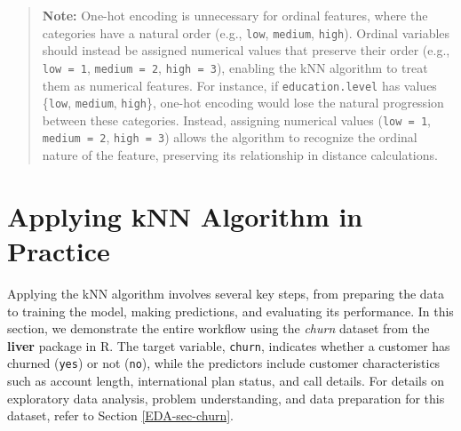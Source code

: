 \documentclass[
  11pt,
]{book}
\newcommand{\passthrough}[1]{#1}
\theoremstyle{definition}
\theoremstyle{definition}
\theoremstyle{definition}
\theoremstyle{definition}
\theoremstyle{remark}
\begin{document}
\begin{quote}
\textbf{Note:} One-hot encoding is unnecessary for ordinal features, where the categories have a natural order (e.g., \passthrough{\lstinline!low!}, \passthrough{\lstinline!medium!}, \passthrough{\lstinline!high!}). Ordinal variables should instead be assigned numerical values that preserve their order (e.g., \passthrough{\lstinline!low = 1!}, \passthrough{\lstinline!medium = 2!}, \passthrough{\lstinline!high = 3!}), enabling the kNN algorithm to treat them as numerical features. For instance, if \passthrough{\lstinline!education.level!} has values \{\passthrough{\lstinline!low!}, \passthrough{\lstinline!medium!}, \passthrough{\lstinline!high!}\}, one-hot encoding would lose the natural progression between these categories. Instead, assigning numerical values (\passthrough{\lstinline!low = 1!}, \passthrough{\lstinline!medium = 2!}, \passthrough{\lstinline!high = 3!}) allows the algorithm to recognize the ordinal nature of the feature, preserving its relationship in distance calculations.
\end{quote}

\section{Applying kNN Algorithm in Practice}\label{sec-kNN-churn}

Applying the kNN algorithm involves several key steps, from preparing the data to training the model, making predictions, and evaluating its performance. In this section, we demonstrate the entire workflow using the \emph{churn} dataset from the \textbf{liver} package in R. The target variable, \passthrough{\lstinline!churn!}, indicates whether a customer has churned (\passthrough{\lstinline!yes!}) or not (\passthrough{\lstinline!no!}), while the predictors include customer characteristics such as account length, international plan status, and call details. For details on exploratory data analysis, problem understanding, and data preparation for this dataset, refer to Section \ref{EDA-sec-churn}.
\end{document}
